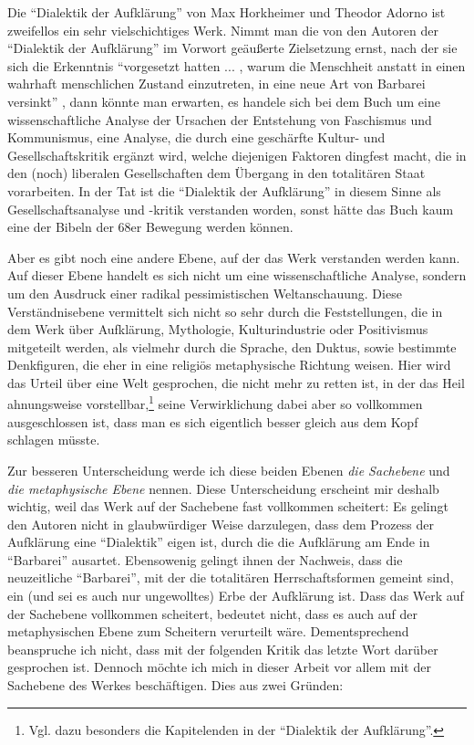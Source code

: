 \documentclass[12pt,a4paper,ngerman]{article}
\begin{document}
Die "`Dialektik der Aufklärung"' von Max Horkheimer und Theodor Adorno ist
zweifellos ein sehr vielschichtiges Werk. Nimmt man die von den Autoren der
"`Dialektik der Aufklärung"' im Vorwort geäußerte Zielsetzung ernst, nach der
sie sich die Erkenntnis "`vorgesetzt hatten ... , warum die Menschheit anstatt
in einen wahrhaft menschlichen Zustand einzutreten, in eine neue Art von
Barbarei versinkt"' \cite[S. 1]{adorno-horkheimer:1947}, dann könnte man
erwarten, es handele sich bei dem Buch um eine wissenschaftliche Analyse der
Ursachen der Entstehung von Faschismus und Kommunismus, eine Analyse, die
durch eine geschärfte Kultur- und Gesellschaftskritik ergänzt wird, welche
diejenigen Faktoren dingfest macht, die in den (noch) liberalen Gesellschaften
dem Übergang in den totalitären Staat vorarbeiten. In der Tat ist die
"`Dialektik der Aufklärung"' in diesem Sinne als Gesellschaftsanalyse und
-kritik verstanden worden, sonst hätte das Buch kaum eine der Bibeln der 68er
Bewegung werden können.

Aber es gibt noch eine andere Ebene, auf der das Werk verstanden werden
kann. Auf dieser Ebene handelt es sich nicht um eine wissenschaftliche
Analyse, sondern um den Ausdruck einer radikal pessimistischen
Weltanschauung. Diese Verständnisebene vermittelt sich nicht so sehr durch die
Feststellungen, die in dem Werk über Aufklärung, Mythologie, Kulturindustrie
oder Positivismus mitgeteilt werden, als vielmehr durch die Sprache, den
Duktus, sowie bestimmte Denkfiguren, die eher in eine religiös metaphysische
Richtung weisen. Hier wird das Urteil über eine Welt gesprochen, die nicht
mehr zu retten ist, in der das Heil ahnungsweise
vorstellbar,\footnote{Vgl. dazu besonders die Kapitelenden in der "`Dialektik
der Aufklärung"'.} seine Verwirklichung dabei aber so vollkommen
ausgeschlossen ist, dass man es sich eigentlich besser gleich aus dem Kopf
schlagen müsste. 

Zur besseren Unterscheidung werde ich diese beiden Ebenen {\em die Sachebene}
und {\em die metaphysische Ebene} nennen. Diese Unterscheidung erscheint mir
deshalb wichtig, weil das Werk auf der Sachebene fast vollkommen scheitert: Es
gelingt den Autoren nicht in glaubwürdiger Weise darzulegen, dass dem Prozess
der Aufklärung eine "`Dialektik"' eigen ist, durch die die Aufklärung am Ende
in "`Barbarei"' ausartet. Ebensowenig gelingt ihnen der Nachweis, dass die
neuzeitliche "`Barbarei"', mit der die totalitären Herrschaftsformen gemeint
sind, ein (und sei es auch nur ungewolltes) Erbe der Aufklärung ist. Dass das
Werk auf der Sachebene vollkommen scheitert, bedeutet nicht, dass es auch auf
der metaphysischen Ebene zum Scheitern verurteilt wäre. Dementsprechend
beanspruche ich nicht, dass mit der folgenden Kritik das letzte Wort darüber
gesprochen ist. Dennoch möchte ich mich in dieser Arbeit vor allem mit der
Sachebene des Werkes beschäftigen. Dies aus zwei Gründen:
\end{document}
